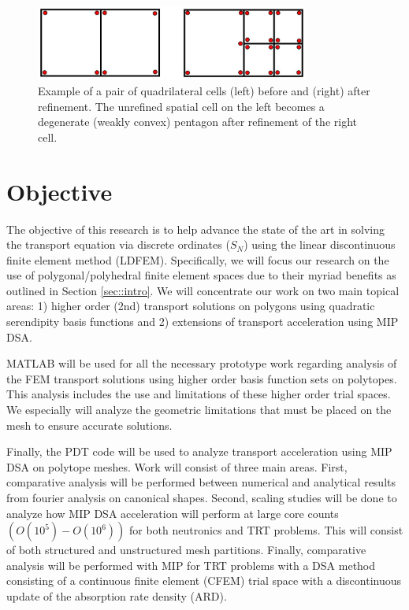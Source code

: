 \documentclass[11pt]{article}
\begin{document}
\begin{figure}[!ht]
\vspace{2mm}
\centering
\includegraphics[width=0.80\textwidth]{figures/locally_refined_nodes.png}
\caption{Example of a pair of quadrilateral cells (left) before and (right) after refinement. The unrefined spatial cell on the left becomes a degenerate (weakly convex) pentagon after refinement of the right cell.}
\vspace{2mm}
\label{fig::LRN}
\end{figure}

\section{Objective}
\label{sec::obj}

The objective of this research is to help advance the state of the art in solving the transport equation via discrete ordinates ($S_N$) using the linear discontinuous finite element method (LDFEM). Specifically, we will focus our research on the use of polygonal/polyhedral finite element spaces due to their myriad benefits as outlined in Section \ref{sec::intro}. We will concentrate our work on two main topical areas: 1) higher order (2nd) transport solutions on polygons using quadratic serendipity basis functions and 2) extensions of transport acceleration using MIP DSA.

MATLAB will be used for all the necessary prototype work regarding analysis of the FEM transport solutions using higher order basis function sets on polytopes. This analysis includes the use and limitations of these higher order trial spaces. We especially will analyze the geometric limitations that must be placed on the mesh to ensure accurate solutions.

Finally, the PDT code will be used to analyze transport acceleration using MIP DSA on polytope meshes. Work will consist of three main areas. First, comparative analysis will be performed between numerical and analytical results from fourier analysis on canonical shapes. Second, scaling studies will be done to analyze how MIP DSA acceleration will perform at large core counts $(O(10^5) - O(10^6))$ for both neutronics and TRT problems. This will consist of both structured and unstructured mesh partitions. Finally, comparative analysis will be performed with MIP for TRT problems with a DSA method consisting of a continuous finite element (CFEM) trial space with a discontinuous update of the absorption rate density (ARD).
\end{document}
